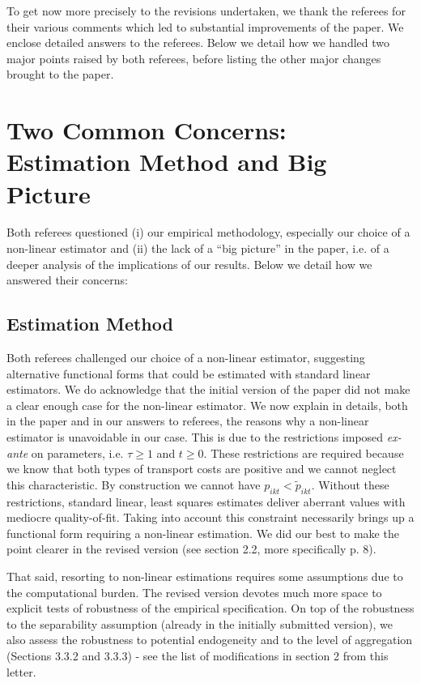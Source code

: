 \documentclass[12pt]{article}
\begin{document}
To get now more precisely to the revisions undertaken, we thank the referees for their various comments which led to substantial improvements of the paper. We enclose detailed answers to the referees. Below we detail how we handled two major points raised by both referees, before listing the other major changes brought to the paper.

\section{Two Common Concerns: Estimation Method and Big Picture}
Both referees questioned (i) our empirical methodology, especially our choice of a non-linear estimator and (ii) the lack of a ``big picture'' in the paper, i.e. of a deeper analysis of the implications of our results. Below we detail how we answered their concerns:\medskip

\subsection{Estimation Method}
Both referees challenged our choice of a non-linear estimator, suggesting alternative functional forms that could be estimated with standard linear estimators. We do acknowledge that the initial version of the paper did not make a clear enough case for the non-linear estimator. We now explain in details, both in the paper and in our answers to referees, the reasons why a non-linear estimator is unavoidable in our case. This is due to the restrictions imposed \textit{ex-ante} on parameters, i.e. $\tau \geq 1$ and $t\geq 0$. These restrictions are required because we know that both types of transport costs are positive and we cannot neglect this characteristic. By construction we cannot have $p_{ikt} < \widetilde{p}_{ikt}$. Without these restrictions, standard linear, least squares estimates deliver aberrant values with mediocre quality-of-fit. Taking into account this constraint necessarily brings up a functional form requiring a non-linear estimation. We did our best to make the point clearer in the revised version (see section 2.2, more specifically p. 8). \medskip

That said, resorting to non-linear estimations requires some assumptions due to the computational burden. The revised version devotes much more space to explicit tests of robustness of the empirical specification. On top of the robustness to the separability assumption (already in the initially submitted version), we also assess the robustness to potential endogeneity and to the level of aggregation (Sections 3.3.2 and 3.3.3) - see the list of modifications in section 2 from this letter. \medskip
\end{document}
